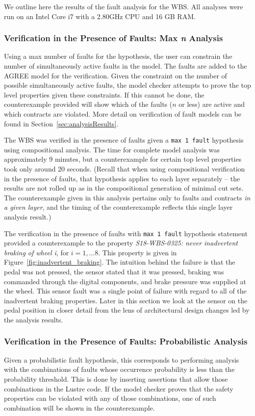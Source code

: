 We outline here the results of the fault analysis for the WBS. All analyses were run on an Intel Core i7 with a 2.80GHz CPU and 16 GB RAM.

\subsubsection{Verification in the Presence of Faults: Max \textit{n} Analysis}
Using a max number of faults for the hypothesis, the user can constrain the number of simultaneously active faults in the model. The faults are added to the AGREE model for the verification. Given the constraint on the number of possible simultaneously active faults, the model checker attempts to prove the top level properties given these constraints. If this cannot be done, the counterexample provided will show which of the faults ($n$ or less) are active and which contracts are violated. More detail on verification of fault models can be found in Section~\ref{sec:analysisResults}. 

The WBS was verified in the presence of faults given a \texttt{max 1 fault} hypothesis using compositional analysis. The time for complete model analysis was approximately 9 minutes, but a counterexample for certain top level properties took only around 20 seconds. (Recall that when using compositional verification in the presence of faults, that hypothesis applies to each layer separately -- the results are not rolled up as in the compositional generation of minimal cut sets. The counterexample given in this analysis pertains only to faults and contracts \textit{in a given layer}, and the timing of the counterexample reflects this single layer analysis result.) 

The verification in the presence of faults with \texttt{max 1 fault} hypothesis statement provided a counterexample to the property {\em S18-WBS-0325: never inadvertent braking of wheel i}, for $i = 1, \dots 8$. This property is given in Figure~\ref{fig:inadvertent_braking}. The intuition behind the failure is that the pedal was not pressed, the sensor stated that it was pressed, braking was commanded through the digital components, and brake pressure was supplied at the wheel. This sensor fault was a single point of failure with regard to all of the inadvertent braking properties. Later in this section we look at the sensor on the pedal position in closer detail from the lens of architectural design changes led by the analysis results. 

\subsubsection{Verification in the Presence of Faults: Probabilistic Analysis} 
Given a probabilistic fault hypothesis, this corresponds to performing analysis with the combinations of faults whose occurrence probability is less than the probability threshold. This is done by inserting assertions that allow those combinations in the Lustre code. If the model checker proves that the safety properties can be violated with any of those combinations, one of such combination will be shown in the counterexample. 


